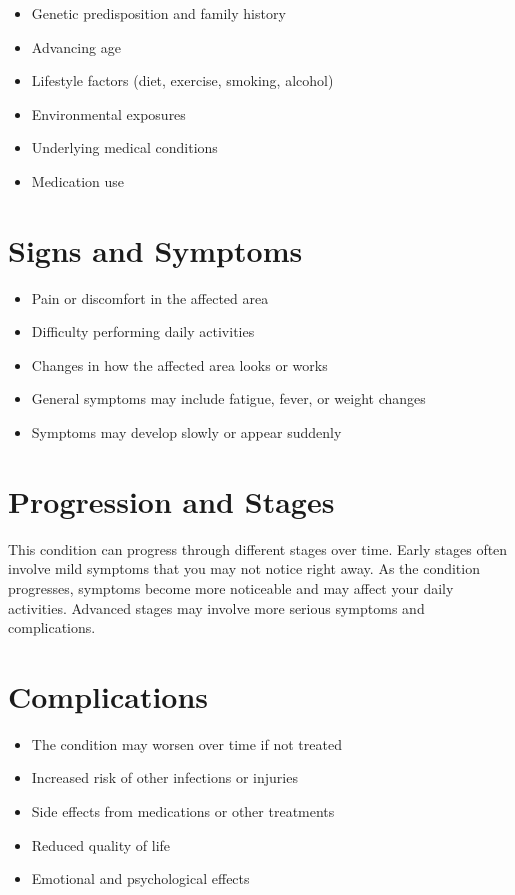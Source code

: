 \begin{itemize}[noitemsep]
  \item Genetic predisposition and family history
  \item Advancing age
  \item Lifestyle factors (diet, exercise, smoking, alcohol)
  \item Environmental exposures
  \item Underlying medical conditions
  \item Medication use
\end{itemize}

\section{Signs and Symptoms}

\begin{itemize}[noitemsep]
  \item Pain or discomfort in the affected area
  \item Difficulty performing daily activities
  \item Changes in how the affected area looks or works
  \item General symptoms may include fatigue, fever, or weight changes
  \item Symptoms may develop slowly or appear suddenly
\end{itemize}

\section{Progression and Stages}
This condition can progress through different stages over time. Early stages often involve mild symptoms that you may not notice right away. As the condition progresses, symptoms become more noticeable and may affect your daily activities. Advanced stages may involve more serious symptoms and complications.

\section{Complications}

\begin{itemize}[noitemsep]
  \item The condition may worsen over time if not treated
  \item Increased risk of other infections or injuries
  \item Side effects from medications or other treatments
  \item Reduced quality of life
  \item Emotional and psychological effects
\end{itemize}

